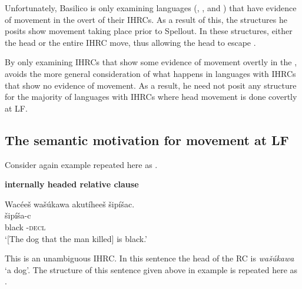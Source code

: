 \documentclass[output=paper]{LSP/langsci}
\begin{document}
Unfortunately, Basilico is only examining languages (, , and ) that have evidence of movement in the overt  of their IHRCs. As a result of this, the structures he posits show movement taking place prior to Spellout. In these structures, either the head or the entire IHRC move, thus allowing the head to escape .   
	
By only examining IHRCs that show some evidence of movement overtly in the , \citeauthor{Basilico1996} avoids the more general consideration of what happens in languages with IHRCs that show no evidence of movement. As a result, he need not posit any structure for the majority of languages with IHRCs where head movement is done covertly at LF.  

\subsection{The semantic motivation for movement at LF}\label{sec:boyle:6.4}

Consider again example  repeated here as .

\ea \textbf{ internally headed relative clause} \label{boyle46}

\glll {\ob}Wacée\v{s} wa\v{s}\'ukawa akut\'ihee\v{s}{\cb} \v{s}ip\'i\v{s}ac.\\
[wacée-\v{s}   wa\v{s}\'uka-wa  aku-t\'i-hee-\v{s}]  \v{s}ip\'i\v{s}a-c\\
[man-\textsc{det.d} dog-\textsc{det.i}  \textsc{rel.s}-die-\textsc{3.caus.d.sg}-\textsc{det.d}] black -\textsc{decl}\\
\trans `[The dog that the man killed] is black.' 
\z

This is an unambiguous IHRC. In this sentence the head of the RC is \textit{wa\v{s}\'ukawa} `a dog'. The structure of this sentence given above in example  is repeated here as . 

\ea 	\label{boyle47}
{\hspace{1em}}\newline
\end{document}
